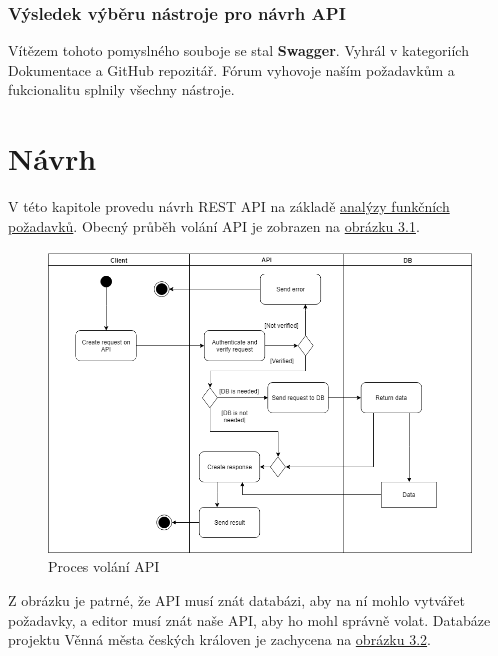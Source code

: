\documentclass[thesis=B,czech]{FITthesis}[2012/06/26]
\begin{document}
        \subsection{Výsledek výběru nástroje pro návrh API}
            Vítězem tohoto pomyslného souboje se stal \textbf{Swagger}. Vyhrál v kategoriích Dokumentace a GitHub repozitář. Fórum vyhovoje naším požadavkům a fukcionalitu splnily všechny nástroje.
\chapter{Návrh}
    V této kapitole provedu návrh REST API na základě \hyperref[sec:analFP]{analýzy funkčních požadavků}. Obecný průběh volání API je zobrazen na \hyperref[fig:volaniAPI]{obrázku 3.1}.
    \begin{figure}[h!] \label{volaniAPI}
        \includegraphics[width=\linewidth]{API_call}
        \caption{Proces volání API}
    \end{figure}
    
    Z obrázku je patrné, že API musí znát databázi, aby na ní mohlo vytvářet požadavky, a editor musí znát naše API, aby ho mohl správně volat. Databáze projektu Věnná města českých královen je zachycena na \hyperref[fig:volaniAPI]{obrázku 3.2}.
\end{document}
